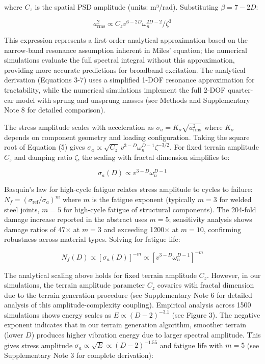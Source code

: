 \documentclass[11pt]{article}
\begin{document}
where $C_z$ is the spatial PSD amplitude (units: m³/rad). Substituting $\beta = 7-2D$:

\begin{equation}
a_{\text{rms}}^2 \propto C_z v^{6-2D} \omega_n^{2D-2} / \zeta^3
\end{equation}

This expression represents a first-order analytical approximation based on the narrow-band resonance assumption inherent in Miles' equation; the numerical simulations evaluate the full spectral integral without this approximation, providing more accurate predictions for broadband excitation. The analytical derivation (Equations 3-7) uses a simplified 1-DOF resonance approximation for tractability, while the numerical simulations implement the full 2-DOF quarter-car model with sprung and unsprung masses (see Methods and Supplementary Note 8 for detailed comparison).

The stress amplitude scales with acceleration as $\sigma_a = K_\sigma \sqrt{a_{\text{rms}}^2}$ where $K_\sigma$ depends on component geometry and loading configuration. Taking the square root of Equation (5) gives $\sigma_a \propto \sqrt{C_z} \, v^{3-D} \omega_n^{D-1} \zeta^{-3/2}$. For fixed terrain amplitude $C_z$ and damping ratio $\zeta$, the scaling with fractal dimension simplifies to:

\begin{equation}
\sigma_a(D) \propto v^{3-D} \omega_n^{D-1}
\end{equation}

Basquin's law for high-cycle fatigue relates stress amplitude to cycles to failure: $N_f = (\sigma_{\text{ref}}/\sigma_a)^m$ where $m$ is the fatigue exponent (typically $m = 3$ for welded steel joints, $m = 5$ for high-cycle fatigue of structural components)\cite{Basquin1910,Dowling2013}. The 204-fold damage increase reported in the abstract uses $m = 5$; sensitivity analysis shows damage ratios of 47× at $m = 3$ and exceeding 1200× at $m = 10$, confirming robustness across material types. Solving for fatigue life:

\begin{equation}
N_f(D) \propto [\sigma_a(D)]^{-m} \propto [v^{3-D} \omega_n^{D-1}]^{-m}
\end{equation}

The analytical scaling above holds for fixed terrain amplitude $C_z$. However, in our simulations, the terrain amplitude parameter $C_z$ covaries with fractal dimension due to the terrain generation procedure (see Supplementary Note 6 for detailed analysis of this amplitude-complexity coupling). Empirical analysis across 1500 simulations shows energy scales as $E \propto (D-2)^{-3.1}$ (see Figure 3). The negative exponent indicates that in our terrain generation algorithm, smoother terrain (lower $D$) produces higher vibration energy due to larger spectral amplitude. This gives stress amplitude $\sigma_a \propto \sqrt{E} \propto (D-2)^{-1.55}$ and fatigue life with $m=5$ (see Supplementary Note 3 for complete derivation):
\end{document}
